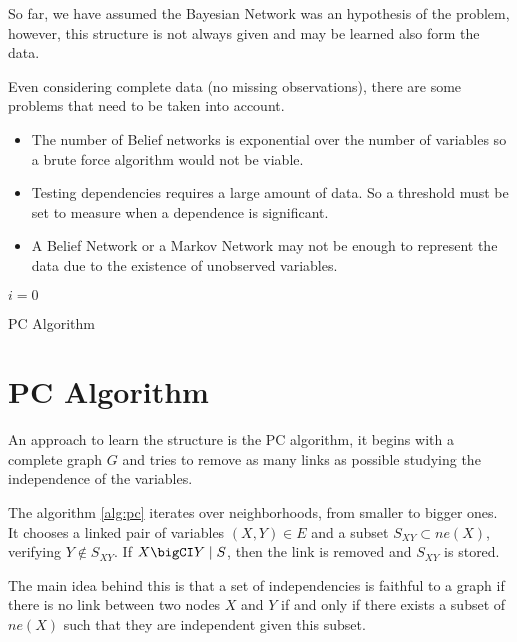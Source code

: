 
So far, we have assumed the Bayesian Network was an hypothesis of the problem, however, this structure is not always given and may be learned also form the data.

Even considering complete data (no missing observations), there are some problems that need to be taken into account.
\begin{itemize}
  \item The number of Belief networks is exponential over the number of
    variables so a brute force algorithm would not be viable.
  \item Testing dependencies requires a large amount of data. So a threshold
    must be set to measure when a dependence is significant.
  \item A Belief Network or a Markov Network may not be enough to represent
    the data due to the existence of unobserved variables.
\end{itemize}


\begin{algorithm}[t]
  \SetAlgoLined
  \(i = 0\)\;
  \caption{PC Algorithm}\label{alg:pc}
\end{algorithm}

\section{PC Algorithm}

An approach to learn the structure is the PC algorithm, it begins with a
complete graph \(G\) and tries to remove as many links as possible studying the
independence of the variables.

The algorithm \ref{alg:pc} iterates over neighborhoods, from smaller to bigger ones. It chooses a linked pair of variables \((X,Y) \in E\) and
a subset \(S_{XY} \subset ne(X)\), verifying
\(Y \notin S_{XY}\). If \(X \bigCI Y \mid S\), then the link is removed and
\(S_{XY}\) is stored.

The main idea behind this is that a set of independencies is
faithful to a graph if there is no link between two nodes \(X\) and \(Y\) if
and only if there exists a subset of \(ne(X)\) such that they are independent
given this subset.

